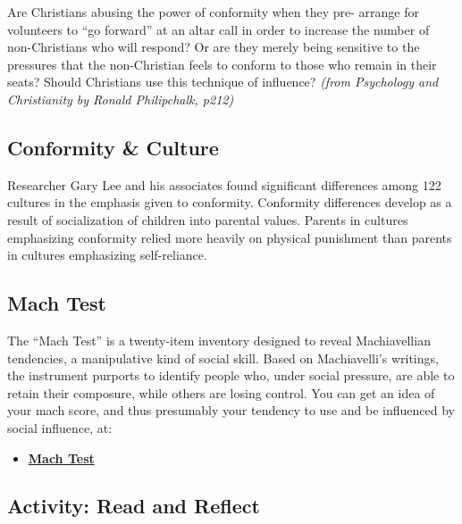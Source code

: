 \documentclass[
]{book}
\providecommand{\tightlist}{%
  \setlength{\itemsep}{0pt}\setlength{\parskip}{0pt}}
\begin{document}
Are Christians abusing the power of conformity when they pre- arrange for volunteers to ``go forward'' at an altar call in order to increase the number of non-Christians who will respond? Or are they merely being sensitive to the pressures that the non-Christian feels to conform to those who remain in their seats? Should Christians use this technique of influence? \emph{(from Psychology and Christianity by Ronald Philipchalk, p212)}

\hypertarget{conformity-culture}{%
\subsection*{Conformity \& Culture}\label{conformity-culture}}

Researcher Gary Lee and his associates found significant differences among 122 cultures in the emphasis given to conformity. Conformity differences de­velop as a result of socialization of children into parental values. Parents in cul­tures emphasizing conformity relied more heavily on physical punishment than parents in cultures emphasizing self-reliance.

\hypertarget{mach-test}{%
\subsection*{Mach Test}\label{mach-test}}

The ``Mach Test'' is a twenty-item inventory designed to reveal Machiavellian tenden­cies, a manipulative kind of social skill. Based on Machiavelli's writings, the in­stru­ment purports to identify people who, under social pressure, are able to retain their composure, while others are losing control. You can get an idea of your mach score, and thus presumably your tendency to use and be influenced by social influence, at:

\begin{itemize}
\tightlist
\item
  \href{https://openpsychometrics.org/tests/MACH-IV/}{\textbf{Mach Test}}
\end{itemize}

\hypertarget{activity-read-and-reflect-6}{%
\subsection*{Activity: Read and Reflect}\label{activity-read-and-reflect-6}}
\end{document}

